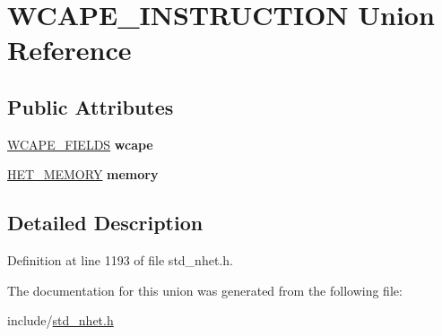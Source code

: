 \hypertarget{unionWCAPE__INSTRUCTION}{}\section{W\+C\+A\+P\+E\+\_\+\+I\+N\+S\+T\+R\+U\+C\+T\+I\+ON Union Reference}
\label{unionWCAPE__INSTRUCTION}
\subsection*{Public Attributes}
\begin{DoxyCompactItemize}
\item 
\mbox{\label{unionWCAPE__INSTRUCTION_a0724f15a8c8a936c8e51d54ed9bcd37f}} 
\mbox{\hyperlink{structwcape__format}{W\+C\+A\+P\+E\+\_\+\+F\+I\+E\+L\+DS}} {\bfseries wcape}
\item 
\mbox{\label{unionWCAPE__INSTRUCTION_a34adcb9b452793c19c6cbeabd220f229}} 
\mbox{\hyperlink{structmemory__format}{H\+E\+T\+\_\+\+M\+E\+M\+O\+RY}} {\bfseries memory}
\end{DoxyCompactItemize}


\subsection{Detailed Description}


Definition at line 1193 of file std\+\_\+nhet.\+h.



The documentation for this union was generated from the following file\+:\begin{DoxyCompactItemize}
\item 
include/\mbox{\hyperlink{std__nhet_8h}{std\+\_\+nhet.\+h}}\end{DoxyCompactItemize}

